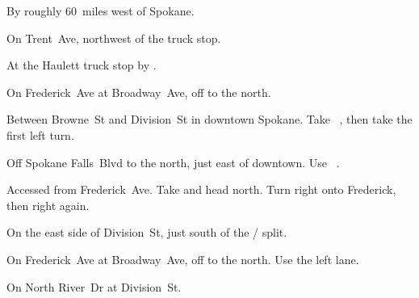 
\begin{LocationList}

By  roughly 60~miles west of Spokane. %

\Location{\GarageHQ \Garage}
On Trent~Ave, northwest of the truck stop.

At the Haulett truck stop by  .

On Frederick~Ave at Broadway~Ave, off   to the north.

Between Browne~St and Division~St in downtown Spokane.
Take~ , then take the first left turn.

Off Spokane Falls~Blvd to the north, just east of downtown.
Use~ .

Accessed from Frederick~Ave.
Take   and head north.
Turn right onto Frederick, then right again.

On the east side of Division~St, just south of the  /  split.

On Frederick~Ave at Broadway~Ave, off   to the north.
Use the left lane.

On North River~Dr at   Division~St.

\end{LocationList}

